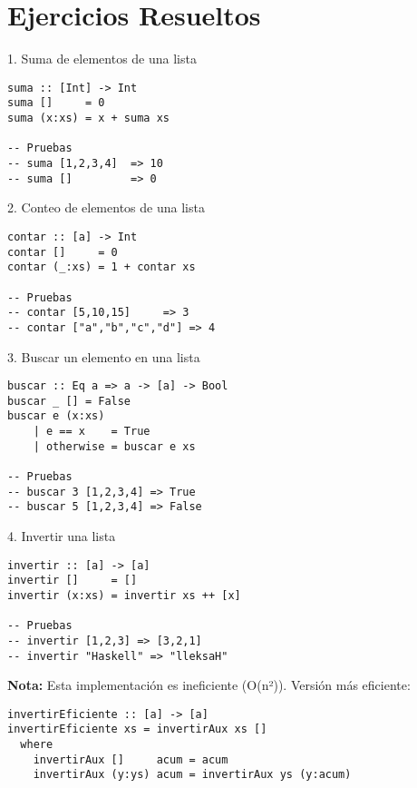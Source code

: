 \documentclass[12pt]{article}
\begin{document}
\section*{Ejercicios Resueltos}

\begin{ejercicio}{1. Suma de elementos de una lista}
\begin{lstlisting}
suma :: [Int] -> Int
suma []     = 0
suma (x:xs) = x + suma xs

-- Pruebas
-- suma [1,2,3,4]  => 10
-- suma []         => 0
\end{lstlisting}
\end{ejercicio}

\begin{ejercicio}{2. Conteo de elementos de una lista}
\begin{lstlisting}
contar :: [a] -> Int
contar []     = 0
contar (_:xs) = 1 + contar xs

-- Pruebas
-- contar [5,10,15]     => 3
-- contar ["a","b","c","d"] => 4
\end{lstlisting}
\end{ejercicio}

\begin{ejercicio}{3. Buscar un elemento en una lista}
\begin{lstlisting}
buscar :: Eq a => a -> [a] -> Bool
buscar _ [] = False
buscar e (x:xs)
    | e == x    = True
    | otherwise = buscar e xs

-- Pruebas
-- buscar 3 [1,2,3,4] => True
-- buscar 5 [1,2,3,4] => False
\end{lstlisting}
\end{ejercicio}

\begin{ejercicio}{4. Invertir una lista}
\begin{lstlisting}
invertir :: [a] -> [a]
invertir []     = []
invertir (x:xs) = invertir xs ++ [x]

-- Pruebas
-- invertir [1,2,3] => [3,2,1]
-- invertir "Haskell" => "lleksaH"
\end{lstlisting}
\textbf{Nota:} Esta implementación es ineficiente (O(n²)). Versión más eficiente:
\begin{lstlisting}
invertirEficiente :: [a] -> [a]
invertirEficiente xs = invertirAux xs []
  where
    invertirAux []     acum = acum
    invertirAux (y:ys) acum = invertirAux ys (y:acum)
\end{lstlisting}
\end{ejercicio}
\end{document}
